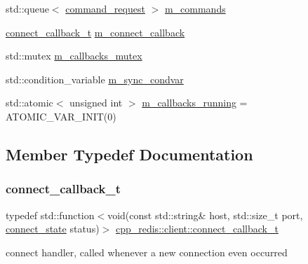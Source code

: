 \begin{DoxyCompactItemize}
\item 
std\+::queue$<$ \hyperlink{structcpp__redis_1_1client_1_1command__request}{command\+\_\+request} $>$ \hyperlink{classcpp__redis_1_1client_ac59027c12904b52b41d07eeab9288fc0}{m\+\_\+commands}
\item 
\hyperlink{classcpp__redis_1_1client_a4bb592b64ededde5a6fcf8111ca2548f}{connect\+\_\+callback\+\_\+t} \hyperlink{classcpp__redis_1_1client_a687926859443c50e47289a4f07d7aaa3}{m\+\_\+connect\+\_\+callback}
\item 
std\+::mutex \hyperlink{classcpp__redis_1_1client_ade039dd0ae2e1e6d1aa3c1c0e6f6fedd}{m\+\_\+callbacks\+\_\+mutex}
\item 
std\+::condition\+\_\+variable \hyperlink{classcpp__redis_1_1client_a3dcead667f0e7a23766fbd35bcf8cfc2}{m\+\_\+sync\+\_\+condvar}
\item 
std\+::atomic$<$ unsigned int $>$ \hyperlink{classcpp__redis_1_1client_aa9737d2eebc3a80c26f2bee3fa1a4108}{m\+\_\+callbacks\+\_\+running} = A\+T\+O\+M\+I\+C\+\_\+\+V\+A\+R\+\_\+\+I\+N\+IT(0)
\end{DoxyCompactItemize}


\subsection{Member Typedef Documentation}
\mbox{\label{classcpp__redis_1_1client_a4bb592b64ededde5a6fcf8111ca2548f}} 
\subsubsection{\texorpdfstring{connect\+\_\+callback\+\_\+t}{connect\_callback\_t}}
{\footnotesize\ttfamily typedef std\+::function$<$void(const std\+::string\& host, std\+::size\+\_\+t port, \hyperlink{classcpp__redis_1_1client_a2512bd48dd45391249a69bd720c1e4da}{connect\+\_\+state} status)$>$ \hyperlink{classcpp__redis_1_1client_a4bb592b64ededde5a6fcf8111ca2548f}{cpp\+\_\+redis\+::client\+::connect\+\_\+callback\+\_\+t}}

connect handler, called whenever a new connection even occurred \mbox{\label{classcpp__redis_1_1client_a061a1140d36d2eaeda82b09a0bb3f9f2}} 
